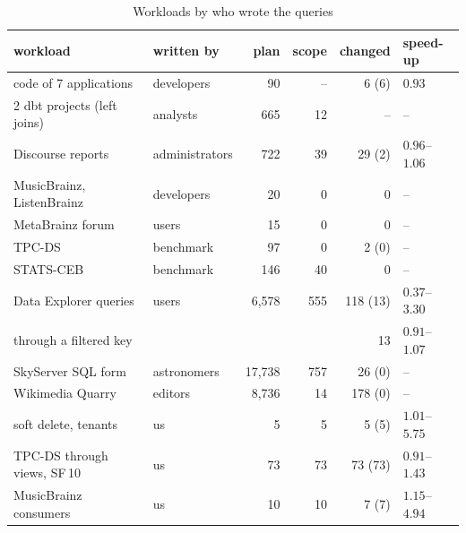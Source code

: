 \documentclass[conference]{IEEEtran}
\theoremstyle{definition}
\begin{document}
\begin{table}[t]\centering\scriptsize\setlength{\tabcolsep}{2.5pt}
\caption{Workloads by who wrote the queries}\label{tab:workloads}
\begin{tabular}{@{}llrrrl@{}}\toprule
workload & written by & plan & scope & changed & speed-up\\\midrule
code of 7 applications & developers & 90 & -- & 6 (6) & $0.93$\\
2 dbt projects (left joins) & analysts & 665 & 12 & -- & --\\
Discourse reports & administrators & 722 & 39 & 29 (2) & $0.96$--$1.06$\\
MusicBrainz, ListenBrainz & developers & 20 & 0 & 0 & --\\
MetaBrainz forum & users & 15 & 0 & 0 & --\\
TPC-DS & benchmark & 97 & 0 & 2 (0) & --\\
STATS-CEB & benchmark & 146 & 40 & 0 & --\\\midrule
Data Explorer queries & users & 6{,}578 & 555 & 118 (13) & $0.37$--$3.30$\\
\quad through a filtered key & & & & 13 & $0.91$--$1.07$\\
SkyServer SQL form & astronomers & 17{,}738 & 757 & 26 (0) & --\\
Wikimedia Quarry & editors & 8{,}736 & 14 & 178 (0) & --\\\midrule
soft delete, tenants & us & 5 & 5 & 5 (5) & $1.01$--$5.75$\\
TPC-DS through views, SF\,10 & us & 73 & 73 & 73 (73) & $0.91$--$1.43$\\
MusicBrainz consumers & us & 10 & 10 & 7 (7) & $1.15$--$4.94$\\\bottomrule
\end{tabular}
\end{table}
\end{document}
